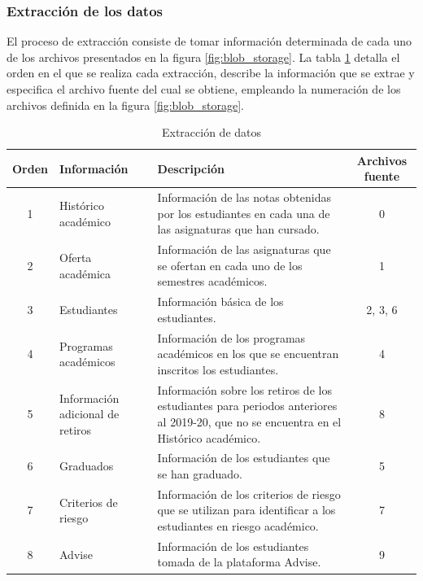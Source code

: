 \subsubsection{Extracción de los datos}

El proceso de extracción consiste de tomar información determinada de cada uno de los archivos presentados en la figura \ref{fig:blob_storage}. La tabla \ref{tab:extraccion} detalla el orden en el que se realiza cada extracción, describe la información que se extrae y especifica el archivo fuente del cual se obtiene, empleando la numeración de los archivos definida en la figura \ref{fig:blob_storage}.

\begin{table}[h]
  \centering
  \caption{Extracción de datos}
  \alternatecolors
  \begin{tabular}{cp{2.3cm}p{7cm}c}
  \hline
  \textbf{Orden} & \textbf{Información} & \textbf{Descripción} & \textbf{Archivos fuente} \\
  \hline
  1 & Histórico académico & Información de las notas obtenidas por los estudiantes en cada una de las asignaturas que han cursado. & 0 \\
  2 & Oferta \newline académica & Información de las asignaturas que se ofertan en cada uno de los semestres académicos. & 1 \\
  3 & Estudiantes & Información básica de los estudiantes. & 2, 3, 6 \\
  4 & Programas académicos & Información de los programas académicos en los que se encuentran inscritos los estudiantes. & 4 \\
  5 & Información \newline adicional \newline de retiros & Información sobre los retiros de los estudiantes para periodos anteriores al 2019-20, que no se encuentra en el Histórico académico. & 8 \\
  6 & Graduados & Información de los estudiantes que se han graduado. & 5 \\
  7 & Criterios \newline de riesgo & Información de los criterios de riesgo que se utilizan para identificar a los estudiantes en riesgo académico. & 7 \\
  8 & Advise & Información de los estudiantes tomada de la plataforma Advise. & 9 \\
  \hline
  \end{tabular}
  \label{tab:extraccion}
\end{table}

